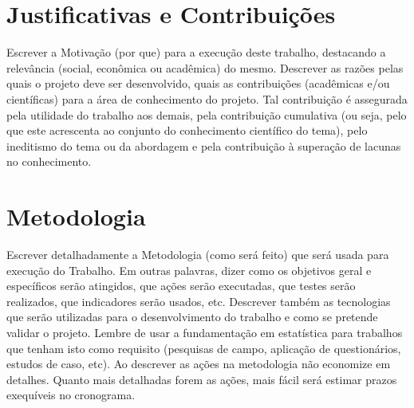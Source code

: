 \documentclass[font=plain]{abnt}
\begin{document}


\chapter{Justificativas e Contribuições}
Escrever a Motivação (por que) para a execução deste trabalho, destacando a relevância (social, econômica ou acadêmica) do mesmo. Descrever as razões pelas quais o projeto deve ser desenvolvido, quais as contribuições (acadêmicas e/ou científicas) para a área de conhecimento do projeto. Tal contribuição é assegurada pela utilidade do trabalho aos demais, pela contribuição cumulativa (ou seja, pelo que este acrescenta ao conjunto do conhecimento científico do tema), pelo ineditismo do tema ou da abordagem e pela contribuição à superação de lacunas no conhecimento.

\chapter{Metodologia}
Escrever detalhadamente a Metodologia (como será feito)  que será usada para execução do Trabalho. Em outras palavras, dizer como os objetivos geral e específicos serão atingidos, que ações serão executadas, que testes serão realizados, que indicadores serão usados, etc. Descrever também as tecnologias que serão utilizadas para o desenvolvimento do trabalho e como se pretende validar o projeto. Lembre de usar a fundamentação em estatística para trabalhos que tenham isto como requisito (pesquisas de campo, aplicação de questionários, estudos de caso, etc). Ao descrever as ações na metodologia não economize em detalhes. Quanto mais detalhadas forem as ações, mais fácil será estimar prazos exequíveis no cronograma.
\end{document}
